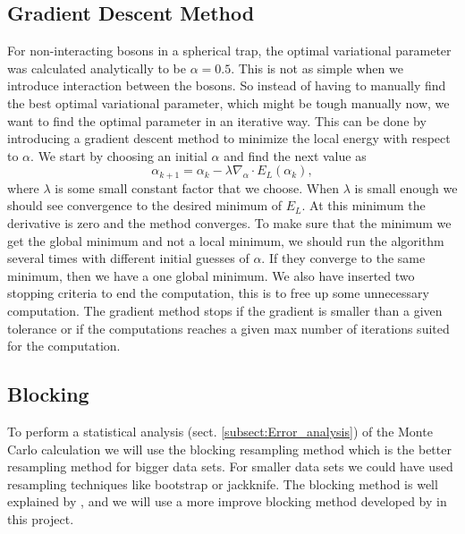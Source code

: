 \documentclass[12pt,a4paper,english]{article}
\begin{document}
\subsection{Gradient Descent Method}
\label{subsect:Gradient}
For non-interacting bosons in a spherical trap, the optimal variational parameter was calculated analytically to be $\alpha=0.5$. This is not as simple when we introduce interaction between the bosons. So instead of having to manually find the best optimal variational parameter, which might be tough manually now, we want to find the optimal parameter in an iterative way. This can be done by introducing a gradient descent method to minimize the local energy with respect to $\alpha$. We start by choosing an initial $\alpha$ and find the next value as
\begin{equation}
\label{eq:grad_recursive}
\alpha_{k+1}=\alpha_k-\lambda\nabla_{\alpha}\cdot E_L(\alpha_k),
\end{equation}
where $\lambda$ is some small constant factor that we choose. When $\lambda$ is small enough we should see convergence to the desired minimum of $E_L$. At this minimum the derivative is zero and the method converges. To make sure that the minimum we get the global minimum and not a local minimum, we should run the algorithm several times with different initial guesses of $\alpha$. If they converge to the same minimum, then we have a one global minimum. We also have inserted two stopping criteria to end the computation, this is to free up some unnecessary computation. The gradient method stops if the gradient is smaller than a given tolerance or if the computations reaches a given max number of iterations suited for the computation.

\subsection{Blocking}
\label{subsect:Blocking}
To perform a statistical analysis (sect. \ref{subsect:Error_analysis}) of the Monte Carlo calculation we will use the blocking resampling method which is the better resampling method for bigger data sets. For smaller data sets we could have used resampling techniques like bootstrap or jackknife. The blocking method is well explained by \citet{flyvbjerg1989error}, and we will use a more improve blocking method developed by \citet{jonsson2018standard} in this project. 
\end{document}
